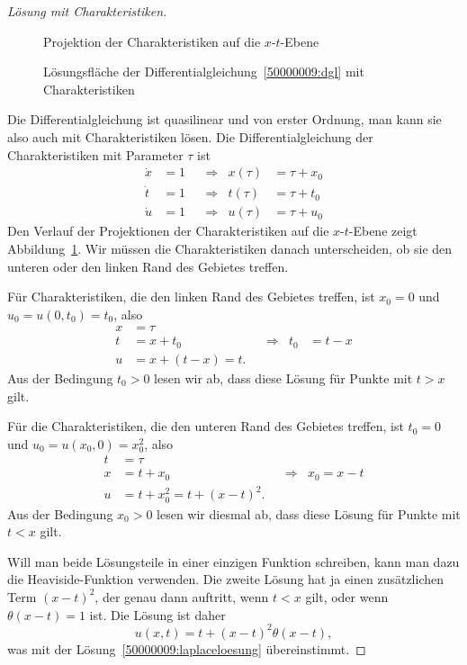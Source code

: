 \begin{proof}[Lösung mit Charakteristiken]
\begin{figure}
\centering
{}
\caption{Projektion der Charakteristiken auf die $x$-$t$-Ebene
\label{50000009:charakteristiken}}
\end{figure}
\begin{figure}
\centering
{}
\caption{Lösungsfläche der Differentialgleichung~\ref{50000009:dgl}
mit Charakteristiken
\label{50000009:loesung}}
\end{figure}
Die Differentialgleichung ist quasilinear und von erster Ordnung, man kann
sie also auch mit Charakteristiken lösen.
Die Differentialgleichung der Charakteristiken mit Parameter $\tau$ ist
\[
\begin{aligned}
\dot x&=1& &\Rightarrow& x(\tau)&=\tau + x_0\\
\dot t&=1& &\Rightarrow& t(\tau)&=\tau + t_0\\
\dot u&=1& &\Rightarrow& u(\tau)&=\tau + u_0
\end{aligned}
\]
Den Verlauf der Projektionen der Charakteristiken auf die $x$-$t$-Ebene zeigt
Abbildung~\ref{50000009:charakteristiken}.
Wir müssen die Charakteristiken danach unterscheiden, ob sie den unteren
oder den linken Rand des Gebietes treffen.

Für Charakteristiken, die den linken Rand des Gebietes treffen, ist $x_0=0$
und $u_0=u(0,t_0)=t_0$, also
\[
\begin{aligned}
x&=\tau\\
t&=x+t_0&&\Rightarrow& t_0&=t-x\\
u&=x+(t-x)=t.
\end{aligned}
\]
Aus der Bedingung $t_0>0$ lesen wir ab, dass diese Lösung für Punkte
mit $t>x$ gilt.

Für die Charakteristiken, die den unteren Rand des Gebietes treffen,
ist $t_0=0$ und $u_0=u(x_0,0)=x_0^2$, also
\[
\begin{aligned}
t&=\tau\\
x&=t+x_0&&\Rightarrow&x_0=x-t\\
u&=t+x_0^2=t+(x-t)^2.
\end{aligned}
\]
Aus der Bedingung $x_0>0$ lesen wir diesmal ab, dass diese Lösung für Punkte
mit $t < x$ gilt.

Will man beide Lösungsteile in einer einzigen Funktion schreiben, kann
man dazu die Heaviside-Funktion verwenden. Die zweite Lösung hat ja
einen zusätzlichen Term $(x-t)^2$, der genau dann auftritt, wenn $t<x$
gilt, oder wenn $\theta(x-t)=1$ ist.
Die Lösung ist daher
\begin{equation}
u(x,t)=t+(x-t)^2\theta(x-t),
\label{50000009:charakteristikenloesung}
\end{equation}
was mit der Lösung~\eqref{50000009:laplaceloesung} übereinstimmt.
\end{proof}

